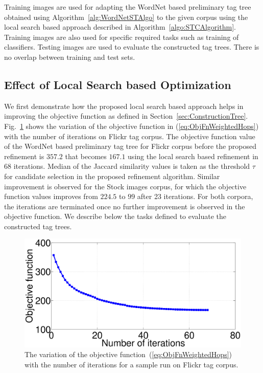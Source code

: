 Training images are used for adapting the WordNet based preliminary tag tree obtained using Algorithm~\ref{alg:WordNetSTAlgo} to the given corpus using the local search based approach described in Algorithm~\ref{algo:STCAlgorithm}. Training images are also used for specific required tasks such as training of classifiers. Testing images are used to evaluate the constructed tag trees. There is no overlap between training and test sets.



\subsection{Effect of Local Search based Optimization}
We first demonstrate how the proposed local search based approach helps in improving the objective function as defined in Section~\ref{sec:ConstructionTree}. Fig.~\ref{fig:ObjFun} shows the variation of the objective function in (\ref{eq:ObjFnWeightedHops}) with the number of iterations on Flickr tag corpus. The objective function value of the WordNet based preliminary tag tree for Flickr corpus before the proposed refinement is $357.2$ that becomes $167.1$ using the local search based refinement in $68$ iterations. Median of the Jaccard similarity values is taken as the threshold $\tau$ for candidate selection in the proposed refinement algorithm. Similar improvement is observed for the Stock images corpus, for which the objective function values improves from $224.5$ to $99$ after 23 iterations. For both corpora, the iterations are terminated once no further improvement is observed in the objective function. We describe below the tasks defined to evaluate the constructed tag trees. 
\begin{figure}[h!]
\begin{center}
\includegraphics[width=0.65\linewidth]{TagTree/LSWWW_objectivefnValuePerIteration}
\caption{The variation of the objective function~(\ref{eq:ObjFnWeightedHops}) with the number of iterations for a sample run on Flickr tag corpus.} 
\label{fig:ObjFun}
\end{center}
\end{figure}

